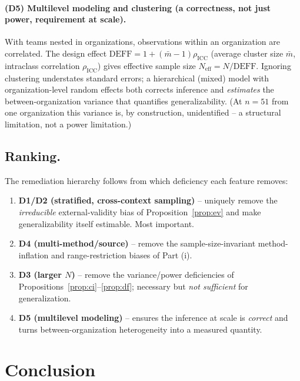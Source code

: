 \documentclass{amsart}
\theoremstyle{definition}
\begin{document}
\paragraph{(D5) Multilevel modeling and clustering (a correctness, not just
power, requirement at scale).}
With teams nested in organizations, observations within an organization are
correlated. The design effect $\mathrm{DEFF}=1+(\bar m-1)\rho_{\text{ICC}}$
(average cluster size $\bar m$, intraclass correlation $\rho_{\text{ICC}}$)
gives effective sample size $N_{\text{eff}}=N/\mathrm{DEFF}$. Ignoring
clustering understates standard errors; a hierarchical (mixed) model with
organization-level random effects both corrects inference and \emph{estimates}
the between-organization variance that quantifies generalizability. (At
$n=51$ from one organization this variance is, by construction,
unidentified -- a structural limitation, not a power limitation.)

\subsection*{Ranking.}
The remediation hierarchy follows from which deficiency each feature removes:
\begin{enumerate}
\item \textbf{D1/D2 (stratified, cross-context sampling)} -- uniquely remove
the \emph{irreducible} external-validity bias of
Proposition~\ref{prop:ev} and make generalizability itself estimable. Most
important.
\item \textbf{D4 (multi-method/source)} -- remove the
sample-size-invariant method-inflation and range-restriction biases of
Part (i).
\item \textbf{D3 (larger $N$)} -- remove the variance/power deficiencies of
Propositions~\ref{prop:ci}--\ref{prop:df}; necessary but \emph{not
sufficient} for generalization.
\item \textbf{D5 (multilevel modeling)} -- ensures the inference at scale is
\emph{correct} and turns between-organization heterogeneity into a measured
quantity.
\end{enumerate}

\section*{Conclusion}
\end{document}
